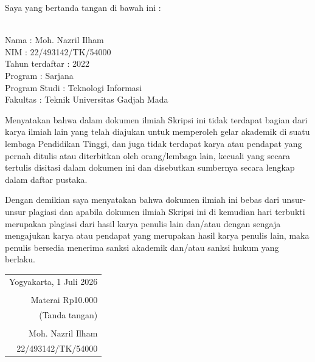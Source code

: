 \noindent Saya yang bertanda tangan di bawah ini :

\vspace{-1em}

\begin{tabbing}
\hspace{40mm} \= \\ %
\noindent Nama \> : Moh. Nazril Ilham \\[\parskip]
\noindent NIM \> : 22/493142/TK/54000 \\[\parskip]
\noindent Tahun terdaftar \> : 2022  \\[\parskip]
\noindent Program \> : Sarjana \\[\parskip]
\noindent Program Studi \> : Teknologi Informasi \\[\parskip]
\noindent Fakultas \> : Teknik Universitas Gadjah Mada
\end{tabbing}

\noindent Menyatakan bahwa dalam dokumen ilmiah Skripsi ini tidak terdapat bagian dari karya ilmiah lain yang telah diajukan untuk memperoleh gelar akademik di suatu lembaga Pendidikan Tinggi, dan juga tidak terdapat karya atau pendapat yang pernah ditulis atau diterbitkan oleh orang/lembaga lain, kecuali yang secara tertulis disitasi dalam dokumen ini dan disebutkan sumbernya secara lengkap dalam daftar pustaka.

\noindent Dengan demikian saya menyatakan bahwa dokumen ilmiah ini bebas dari unsur-unsur plagiasi dan apabila dokumen ilmiah Skripsi ini di kemudian hari terbukti merupakan plagiasi dari hasil karya penulis lain dan/atau dengan sengaja mengajukan karya atau pendapat yang merupakan hasil karya penulis lain, maka penulis bersedia menerima sanksi akademik dan/atau sanksi hukum yang berlaku.


\begin{flushright}
	\begin{tabular}{r}
		Yogyakarta, 1 Juli 2026 \\
		\vspace{0.1cm} \\
		\tiny{Materai Rp10.000} \\
		\tiny{(Tanda tangan)} \\	
		\vspace{0.1cm} \\
		Moh. Nazril Ilham \\ 22/493142/TK/54000
	\end{tabular}
\end{flushright}